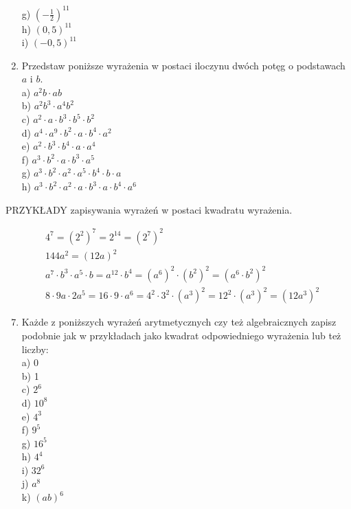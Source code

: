 \documentclass[10pt]{article}
\begin{document}
\begin{enumerate}
g) \(\left(-\frac{1}{2}\right)^{11}\)\\
h) \((0,5)^{11}\)\\
i) \((-0,5)^{11}\)
  \item Przedstaw poniższe wyrażenia w postaci iloczynu dwóch potęg o podstawach \(a\) i \(b\).\\
a) \(a^{2} b \cdot a b\)\\
b) \(a^{2} b^{3} \cdot a^{4} b^{2}\)\\
c) \(a^{2} \cdot a \cdot b^{3} \cdot b^{5} \cdot b^{2}\)\\
d) \(a^{4} \cdot a^{9} \cdot b^{2} \cdot a \cdot b^{4} \cdot a^{2}\)\\
e) \(a^{2} \cdot b^{3} \cdot b^{4} \cdot a \cdot a^{4}\)\\
f) \(a^{3} \cdot b^{2} \cdot a \cdot b^{3} \cdot a^{5}\)\\
g) \(a^{3} \cdot b^{2} \cdot a^{2} \cdot a^{5} \cdot b^{4} \cdot b \cdot a\)\\
h) \(a^{3} \cdot b^{2} \cdot a^{2} \cdot a \cdot b^{3} \cdot a \cdot b^{4} \cdot a^{6}\)
\end{enumerate}

PRZYKŁADY zapisywania wyrażeń w postaci kwadratu wyrażenia.

\[
\begin{aligned}
& 4^{7}=\left(2^{2}\right)^{7}=2^{14}=\left(2^{7}\right)^{2} \\
& 144 a^{2}=(12 a)^{2} \\
& a^{7} \cdot b^{3} \cdot a^{5} \cdot b=a^{12} \cdot b^{4}=\left(a^{6}\right)^{2} \cdot\left(b^{2}\right)^{2}=\left(a^{6} \cdot b^{2}\right)^{2} \\
& 8 \cdot 9 a \cdot 2 a^{5}=16 \cdot 9 \cdot a^{6}=4^{2} \cdot 3^{2} \cdot\left(a^{3}\right)^{2}=12^{2} \cdot\left(a^{3}\right)^{2}=\left(12 a^{3}\right)^{2}
\end{aligned}
\]

\begin{enumerate}
  \setcounter{enumi}{6}
  \item Każde z poniższych wyrażeń arytmetycznych czy też algebraicznych zapisz podobnie jak w przykładach jako kwadrat odpowiedniego wyrażenia lub też liczby:\\
a) 0\\
b) 1\\
c) \(2^{6}\)\\
d) \(10^{8}\)\\
e) \(4^{3}\)\\
f) \(9^{5}\)\\
g) \(16^{5}\)\\
h) \(4^{4}\)\\
i) \(32^{6}\)\\
j) \(a^{8}\)\\
k) \((a b)^{6}\)
\end{enumerate}
\end{document}
